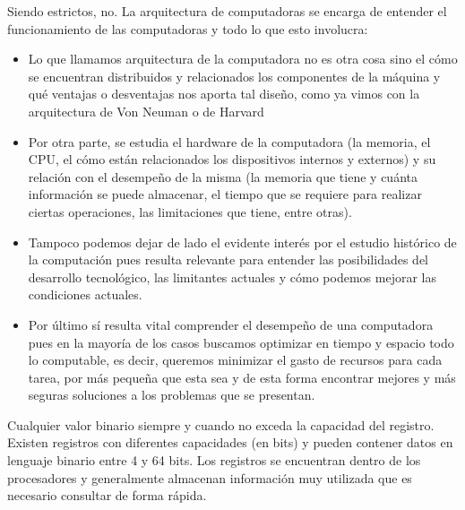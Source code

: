 \documentclass[answers]{exam}
\begin{document}
\thispagestyle{headandfoot}
\begin{questions}
  \begin{solution}
    Siendo estrictos, no. La arquitectura de computadoras se encarga de entender
    el funcionamiento de las computadoras y todo lo que esto involucra:
    \begin{itemize}
      \item Lo que llamamos arquitectura de la computadora no es otra cosa sino
            el cómo se encuentran distribuidos y relacionados los componentes de
            la máquina y qué ventajas o desventajas nos aporta tal diseño, como
            ya vimos con la arquitectura de Von Neuman o de Harvard
      \item Por otra parte, se estudia el hardware de la computadora (la
            memoria, el CPU, el cómo están relacionados los dispositivos
            internos y externos) y su relación con el desempeño de la misma (la
            memoria que tiene y cuánta información se puede almacenar, el tiempo
            que se requiere para realizar ciertas operaciones, las limitaciones
            que tiene, entre otras).
      \item Tampoco podemos dejar de lado el evidente interés por el estudio
            histórico de la computación pues resulta relevante para entender las
            posibilidades del desarrollo tecnológico, las limitantes actuales y
            cómo podemos mejorar las condiciones actuales.
      \item Por último sí resulta vital comprender el desempeño de una
            computadora pues en la mayoría de los casos buscamos optimizar en
            tiempo y espacio todo lo computable, es decir, queremos minimizar el
            gasto de recursos para cada tarea, por más pequeña que esta sea y de
            esta forma encontrar mejores y más seguras soluciones a los
            problemas que se presentan.
    \end{itemize}
  \end{solution}

  \begin{solution}
    Cualquier valor binario siempre y cuando no exceda la capacidad del
    registro. Existen registros con diferentes capacidades (en bits) y pueden
    contener datos en lenguaje binario entre 4 y 64 bits. Los registros se
    encuentran dentro de los procesadores y generalmente almacenan información
    muy utilizada que es necesario consultar de forma rápida.
  \end{solution}



\end{questions}
\end{document}

